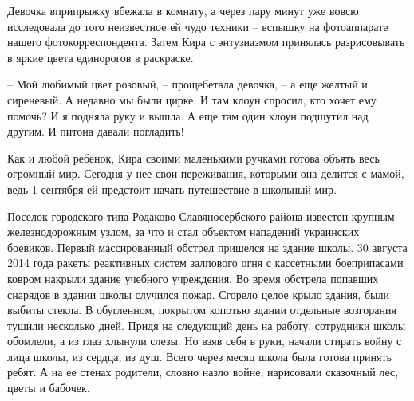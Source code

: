 Девочка вприпрыжку вбежала в комнату, а через пару минут уже вовсю исследовала
до того неизвестное ей чудо техники – вспышку на фотоаппарате нашего
фотокорреспондента. Затем Кира с энтузиазмом принялась разрисовывать в яркие
цвета единорогов в раскраске.

– Мой любимый цвет розовый, – прощебетала девочка, – а еще желтый и сиреневый.
А недавно мы были цирке. И там клоун спросил, кто хочет ему помочь? И я подняла
руку и вышла. А еще там один клоун подшутил над другим. И питона давали
погладить!

Как и любой ребенок, Кира своими маленькими ручками готова объять весь огромный
мир. Сегодня у нее свои переживания, которыми она делится с мамой, ведь 1
сентября ей предстоит начать путешествие в школьный мир.

Поселок городского типа Родаково Славяносербского района известен крупным
железнодорожным узлом, за что и стал объектом нападений украинских боевиков.
Первый массированный обстрел пришелся на здание школы. 30 августа 2014 года
ракеты реактивных систем залпового огня с кассетными боеприпасами ковром
накрыли здание учебного учреждения. Во время обстрела попавших снарядов в
здании школы случился пожар. Сгорело целое крыло здания, были выбиты стекла. В
обугленном, покрытом копотью здании отдельные возгорания тушили несколько дней.
Придя на следующий день на работу, сотрудники школы обомлели, а из глаз хлынули
слезы. Но взяв себя в руки, начали стирать войну с лица школы, из сердца, из
душ. Всего через месяц школа была готова принять ребят. А на ее стенах
родители, словно назло войне, нарисовали сказочный лес, цветы и бабочек.

